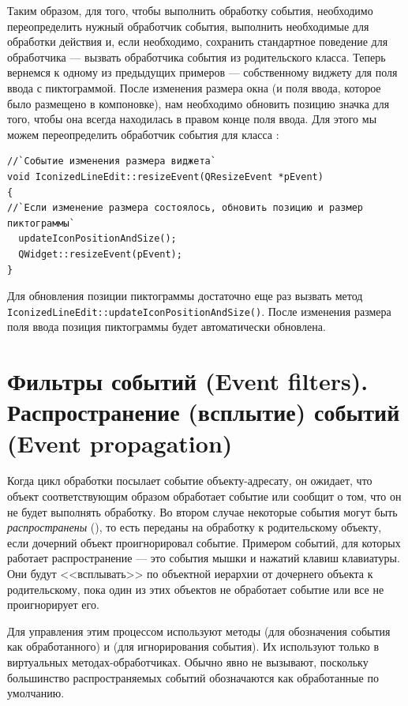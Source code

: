 Таким образом, для того, чтобы выполнить обработку события, необходимо переопределить нужный обработчик события,
выполнить необходимые для обработки действия и, если необходимо, сохранить стандартное поведение для обработчика ---
вызвать обработчика события из родительского класса. Теперь вернемся к одному из предыдущих примеров --- собственному
виджету для поля ввода с пиктограммой. После изменения размера окна (и поля ввода, которое было размещено в
компоновке), нам необходимо обновить позицию значка для того, чтобы она всегда находилась в правом конце поля ввода.
Для этого мы можем переопределить обработчик события  для класса :
\begin{lstlisting}
//`Событие изменения размера виджета`
void IconizedLineEdit::resizeEvent(QResizeEvent *pEvent)
{
//`Если изменение размера состоялось, обновить позицию и размер пиктограммы`
  updateIconPositionAndSize();
  QWidget::resizeEvent(pEvent);
}
\end{lstlisting}

Для обновления позиции пиктограммы достаточно еще раз вызвать метод
\lstinline!IconizedLineEdit::updateIconPositionAndSize()!. После изменения размера поля ввода позиция пиктограммы будет
автоматически обновлена.

\section[Фильтры событий (Event filters)]{Фильтры событий (Event filters). Распространение (всплытие) событий (Event propagation)}
Когда цикл обработки посылает событие объекту-адресату, он ожидает, что объект соответствующим образом обработает
событие или сообщит о том, что он не будет выполнять обработку. 
Во втором случае некоторые события могут быть \emph{распространены} (), то есть переданы на обработку к родительскому объекту, если дочерний объект проигнорировал событие.
Примером событий, для которых работает распространение --- это
события мышки и нажатий клавиш клавиатуры. Они будут <<всплывать>> по объектной иерархии от дочернего объекта к родительскому, пока один из этих объектов не обработает событие или все не проигнорирует его. 

Для управления этим процессом используют методы 
(для обозначения события как обработанного) и  (для игнорирования события). Их
используют только в виртуальных методах-обработчиках. Обычно  явно не вызывают,
поскольку большинство распространяемых событий обозначаются как обработанные по умолчанию.

